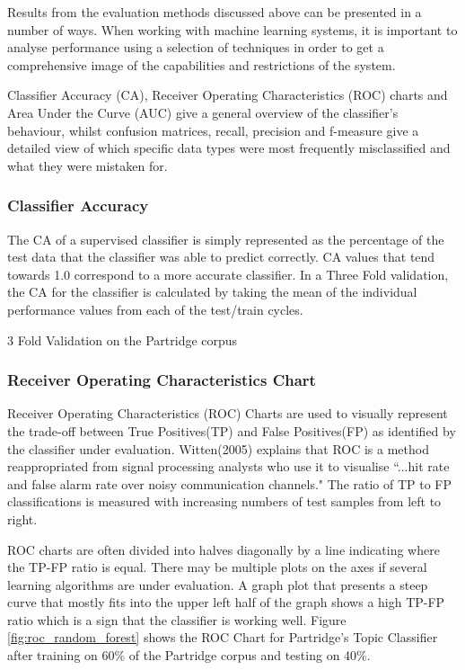 Results from the evaluation methods discussed above can be presented in a
number of ways. When working with machine learning systems, it is important to
analyse performance using a selection of techniques in order to get a
comprehensive image of the capabilities and restrictions of the system.

Classifier Accuracy (CA), Receiver Operating Characteristics
(ROC) charts and Area Under the Curve (AUC) give a general overview of the
classifier's behaviour, whilst confusion matrices, recall, precision and
f-measure give a detailed view of which specific data types were most
frequently misclassified and what they were mistaken for. 

\subsubsection{ Classifier Accuracy } 

The CA of a supervised classifier is simply represented as the percentage of
the test data that the classifier was able to predict correctly. CA values that
tend towards 1.0 correspond to a more accurate classifier. In a Three Fold
validation, the CA for the classifier is calculated by taking the mean of the
individual performance values from each of the test/train cycles. 

3 Fold Validation on the Partridge corpus  

\subsubsection{ Receiver Operating Characteristics Chart}

Receiver Operating Characteristics (ROC) Charts are used to visually represent
the trade-off between True Positives(TP) and False Positives(FP) as identified
by the classifier under evaluation. Witten(2005) explains that ROC is a method
reappropriated from signal processing analysts who use it to visualise ``...hit
rate and false alarm rate over noisy communication
channels\cite{witten2005data}." The ratio of TP to FP classifications is
measured with increasing numbers of test samples from left to right. 

ROC charts are often divided into halves diagonally by a line indicating where
the TP-FP ratio is equal. There may be multiple plots on the axes if several
learning algorithms are under evaluation. A graph plot that presents a steep
curve that mostly fits into the upper left half of the graph shows a high TP-FP
ratio which is a sign that the classifier is working well.  Figure
\ref{fig:roc_random_forest} shows the ROC Chart for Partridge's Topic
Classifier after training on 60\% of the Partridge corpus and testing on 40\%.

